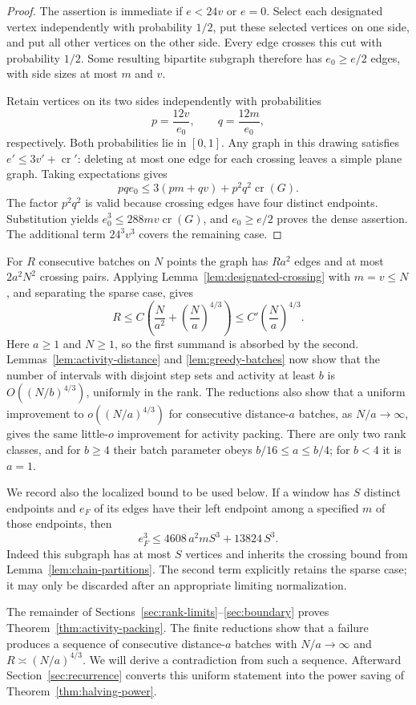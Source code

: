 \begin{proof}
The assertion is immediate if $e<24v$ or $e=0$.  Select each
designated vertex independently with probability $1/2$, put these
selected vertices on one side, and put all other vertices on the
other side.  Every edge crosses this cut with probability $1/2$.
Some resulting bipartite subgraph therefore has $e_0\ge e/2$ edges,
with side sizes at most $m$ and $v$.

Retain vertices on its two sides independently with probabilities
\[
 p=\frac{12v}{e_0},\qquad q=\frac{12m}{e_0},
\]
respectively.  Both probabilities lie in $[0,1]$.  Any graph in this
drawing satisfies $e'\le3v'+\operatorname{cr}'$: deleting at most
one edge for each crossing leaves a simple plane graph.  Taking
expectations gives
\[
 pq e_0\le3(pm+qv)+p^2q^2\operatorname{cr}(G).
\]
The factor $p^2q^2$ is valid because crossing edges have four
distinct endpoints.  Substitution yields
$e_0^3\le288mv\operatorname{cr}(G)$, and $e_0\ge e/2$ proves
the dense assertion.  The additional term $24^3v^3$ covers the
remaining case.
\end{proof}

For $R$ consecutive batches on $N$ points the graph has $Ra^2$ edges
and at most $2a^2N^2$ crossing pairs.  Applying
Lemma~\ref{lem:designated-crossing} with $m=v\le N$, and separating
the sparse case, gives
\[
 R\le C\left(\frac{N}{a^2}+\left(\frac Na\right)^{4/3}\right)
 \le C'\left(\frac Na\right)^{4/3}.
\]
Here $a\ge1$ and $N\ge1$, so the first summand is absorbed by the
second.  Lemmas~\ref{lem:activity-distance} and
\ref{lem:greedy-batches} now show that the number of intervals with
disjoint step sets and activity at least $b$ is
$O((N/b)^{4/3})$, uniformly in the rank.  The reductions also show
that a uniform improvement to $o((N/a)^{4/3})$ for consecutive
distance-$a$ batches, as $N/a\to\infty$, gives the same little-$o$
improvement for activity packing.  There are only two rank classes,
and for $b\ge4$ their batch parameter obeys $b/16\le a\le b/4$;
for $b<4$ it is $a=1$.

We record also the localized bound to be used below.  If a window
has $S$ distinct endpoints and $e_F$ of its edges have their left
endpoint among a specified $m$ of those endpoints, then
\begin{equation}\label{eq:finite-localized-crossing}
 e_F^3\le4608\,a^2mS^3+13824\,S^3.
\end{equation}
Indeed this subgraph has at most $S$ vertices and inherits the
crossing bound from Lemma~\ref{lem:chain-partitions}.  The second
term explicitly retains the sparse case; it may only be discarded
after an appropriate limiting normalization.



The remainder of Sections~\ref{sec:rank-limits}--\ref{sec:boundary}
proves Theorem~\ref{thm:activity-packing}. The finite reductions show that a
failure produces a sequence of consecutive distance-$a$ batches with
$N/a\to\infty$ and $R\asymp(N/a)^{4/3}$. We will derive a contradiction
from such a sequence. Afterward Section~\ref{sec:recurrence} converts
this uniform statement into the power saving of
Theorem~\ref{thm:halving-power}.
